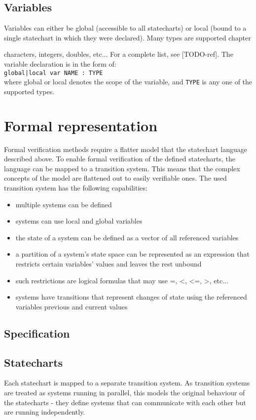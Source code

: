   \subsection{Variables}
Variables can either be global (accessible to all statecharts) or local (bound to a single statechart in which they were declared). Many types are supported chapter{ characters, integers, doubles, etc... For a complete list, see [TODO-ref]. The variable declaration is in the form of: \\\verb!global|local var NAME : TYPE!\\ where global or local denotes the scope of the variable, and \verb!TYPE! is any one of the supported types.
\section{Formal representation}
Formal verification methods require a flatter model that the statechart language described above. To enable formal verification of the defined statecharts, the language can be mapped to a transition system. This means that the complex concepts of the model are flattened out to easily verifiable ones. The used transition system has the following capabilities:
\begin{itemize}
  \item multiple systems can be defined
  \item systems can use local and global variables
  \item the state of a system can be defined as a vector of all referenced variables
  \item a partition of a system's state space can be represented as an expression that restricts certain variables' values and leaves the rest unbound
  \item such restrictions are logical formulas that may use =, <, <=, >, etc...
  \item systems have transitions that represent changes of state using the referenced variables previous and current values
\end{itemize}
  \subsection{Specification}
  \subsection{Statecharts}
Each statechart is mapped to a separate transition system. As transition systems are treated as systems running in parallel, this models the original behaviour of the statecharts - they define systems that can communicate with each other but are running independently.
}

